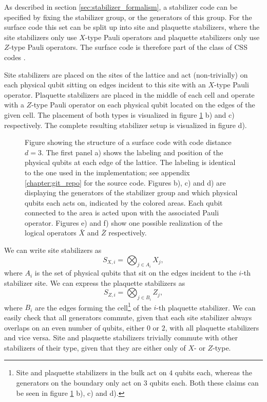 As described in section \ref{sec:stabilizer_formalism}, a stabilizer code can be specified by fixing the stabilizer group, or the generators of this group.
For the surface code this set can be split up into site and plaquette stabilizers, 
where the site stabilizers only use $X$-type Pauli operators and plaquette stabilizers only use $Z$-type Pauli operators.
The surface code is therefore part of the class of CSS codes \cite{CSS1,CSS2}.

Site stabilizers are placed on the sites of the lattice and act (non-trivially) on each physical qubit sitting on edges incident to this site with an $X$-type Pauli operator.
Plaquette stabilizers are placed in the middle of each cell and operate with a $Z$-type Pauli operator on each physical qubit located on the edges of the given cell.
The placement of both types is visualized in figure \ref{fig:surface_code_explaination} b) and c) respectively. 
The complete resulting stabilizer setup is visualized in figure d).

\begin{figure}[ht]
    \centering
    
    \caption{
        Figure showing the structure of a surface code with code distance $d=3$. 
        The first panel a) shows the labeling and position of the physical qubits at each edge of the lattice.
        The labeling is identical to the one used in the implementation; see appendix \ref{chapter:git_repo} for the source code. 
        Figures b), c) and d) are displaying the generators of the stabilizer group and which physical qubits each acts on, 
        indicated by the colored areas.
        Each qubit connected to the area is acted upon with the associated Pauli operator.
        Figures e) and f) show one possible realization of the logical operators $\bar{X}$ and $\bar{Z}$ respectively. 
        }
    \label{fig:surface_code_explaination}
\end{figure}

We can write site stabilizers as 
\begin{equation}
    S_{X,i} =  \bigotimes_{j \in A_i} X_j,
\end{equation}
where $A_i$ is the set of physical qubits that sit on the edges incident to the $i$-th stabilizer site.
We can express the plaquette stabilizers as 
\begin{equation}
    S_{Z,i} =  \bigotimes_{j \in B_i} Z_j,
\end{equation}
where $B_i$ are the edges forming the cell\footnote{
Site and plaquette stabilizers in the bulk act on $4$ qubits each, whereas the generators on the boundary only act on $3$ qubits each.
Both these claims can be seen in figure \ref{fig:surface_code_explaination} b), c) and d).
} of the $i$-th plaquette stabilizer.
We can easily check that all generators commute, given that each site stabilizer always overlaps on an even number of qubits, either $0$ or $2$, with all plaquette stabilizers and vice versa.
Site and plaquette stabilizers trivially commute with other stabilizers of their type, given that they are either only of $X$- or $Z$-type.

